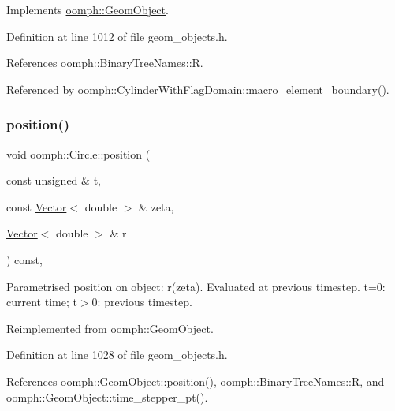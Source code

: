 Implements \hyperlink{classoomph_1_1GeomObject_a0d04c9d4667817f3ef24bb660fd56065}{oomph\+::\+Geom\+Object}.



Definition at line 1012 of file geom\+\_\+objects.\+h.



References oomph\+::\+Binary\+Tree\+Names\+::R.



Referenced by oomph\+::\+Cylinder\+With\+Flag\+Domain\+::macro\+\_\+element\+\_\+boundary().

\mbox{\label{classoomph_1_1Circle_a3d318d67e50a29d7d8916cacc741435b}} 
\subsubsection{\texorpdfstring{position()}{position()}\hspace{0.1cm}{\footnotesize\ttfamily [2/2]}}
{\footnotesize\ttfamily void oomph\+::\+Circle\+::position (\begin{DoxyParamCaption}\item[{const unsigned \&}]{t,  }\item[{const \hyperlink{classoomph_1_1Vector}{Vector}$<$ double $>$ \&}]{zeta,  }\item[{\hyperlink{classoomph_1_1Vector}{Vector}$<$ double $>$ \&}]{r }\end{DoxyParamCaption}) const\hspace{0.3cm}{\ttfamily [inline]}, {\ttfamily [virtual]}}



Parametrised position on object\+: r(zeta). Evaluated at previous timestep. t=0\+: current time; t$>$0\+: previous timestep. 



Reimplemented from \hyperlink{classoomph_1_1GeomObject_ad44a736d23dcd63af163a7d80b5c4dfa}{oomph\+::\+Geom\+Object}.



Definition at line 1028 of file geom\+\_\+objects.\+h.



References oomph\+::\+Geom\+Object\+::position(), oomph\+::\+Binary\+Tree\+Names\+::R, and oomph\+::\+Geom\+Object\+::time\+\_\+stepper\+\_\+pt().

\mbox{\label{classoomph_1_1Circle_afdaf92e7bab3349f00eb28c44ccdce08}} 
